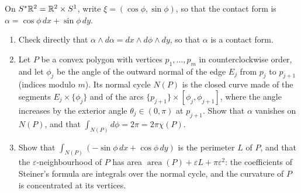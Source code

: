\begin{exercise}\label{symplectic-geometry:exercise-normal-cycle-polygon}
On $S^*\mathbb{R}^2 = \mathbb{R}^2 \times S^1$, write $\xi = (\cos\phi, \sin\phi)$, so that the contact form is $\alpha = \cos\phi\,dx + \sin\phi\,dy$.
\begin{enumerate}
\item Check directly that $\alpha \wedge d\alpha = dx \wedge d\phi \wedge dy$, so that $\alpha$ is a contact form.
\item Let $P$ be a convex polygon with vertices $p_1, \ldots, p_m$ in counterclockwise order, and let $\phi_j$ be the angle of the outward normal of the edge $E_j$ from $p_j$ to $p_{j+1}$ (indices modulo $m$). Its
normal cycle $N(P)$ is the closed curve made of the segments $E_j \times \{\phi_j\}$ and of the arcs $\{p_{j+1}\} \times [\phi_j, \phi_{j+1}]$, where the angle increases by the exterior angle
$\theta_j \in (0, \pi)$ at $p_{j+1}$. Show that $\alpha$ vanishes on $N(P)$, and that $\int_{N(P)}d\phi = 2\pi = 2\pi\chi(P)$.
\item Show that $\int_{N(P)}(-\sin\phi\,dx + \cos\phi\,dy)$ is the perimeter $L$ of $P$, and that the $\varepsilon$-neighbourhood of $P$ has area $\operatorname{area}(P) + \varepsilon L + \pi\varepsilon^2$: the coefficients of
Steiner's formula are integrals over the normal cycle, and the curvature of $P$ is concentrated at its vertices.
\end{enumerate}
\end{exercise}

